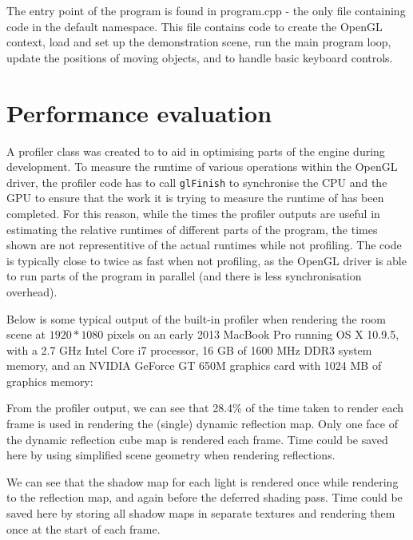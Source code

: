 \documentclass[11pt]{scrartcl} %
\newcommand{\code}[1]{{\texttt{#1}}}
\begin{document}
    The entry point of the program is found in program.cpp - the only file
    containing code in the default namespace. This file contains code to create
    the OpenGL context, load and set up the demonstration scene, run the main
    program loop, update the positions of moving objects, and to handle basic
    keyboard controls.

\section{Performance evaluation}

    A profiler class was created to to aid in optimising parts of the engine
    during development. To measure the runtime of various operations within the
    OpenGL driver, the profiler code has to call \code{glFinish} to synchronise
    the CPU and the GPU to ensure that the work it is trying to measure the
    runtime of has been completed. For this reason, while the times the
    profiler outputs are useful in estimating the relative runtimes of
    different parts of the program, the times shown are not representitive of
    the actual runtimes while not profiling. The code is typically close to
    twice as fast when not profiling, as the OpenGL driver is able to run parts
    of the program in parallel (and there is less synchronisation overhead).

    Below is some typical output of the built-in profiler when rendering the
    room scene at $1920*1080$ pixels on an early 2013 MacBook Pro running OS X
    10.9.5, with a 2.7 GHz Intel Core i7 processor, 16 GB of 1600 MHz DDR3
    system memory, and an NVIDIA GeForce GT 650M graphics card with 1024 MB of
    graphics memory:

    {
        \small
        
    }


    From the profiler output, we can see that 28.4\% of the time taken to
    render each frame is used in rendering the (single) dynamic reflection map.
    Only one face of the dynamic reflection cube map is rendered each frame.
    Time could be saved here by using simplified scene geometry when rendering
    reflections.


    We can see that the shadow map for each light is rendered once while
    rendering to the reflection map, and again before the deferred shading
    pass. Time could be saved here by storing all shadow maps in separate
    textures and rendering them once at the start of each frame.
\end{document}
